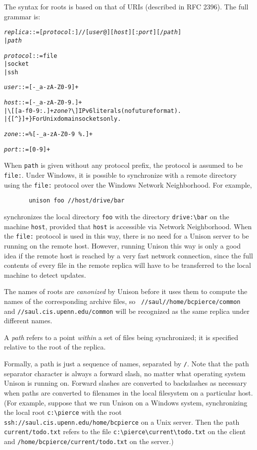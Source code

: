 \documentclass{article}
\newcommand{\NT}[1]{\textit{#1}}
\begin{document}
The syntax for roots is based on that of URIs (described in RFC 2396).
The full grammar is:
\begin{alltt}
  \NT{replica} ::= [\NT{protocol}:]//[\NT{user}@][\NT{host}][:\NT{port}][/\NT{path}]
           |  \NT{path}

  \NT{protocol} ::= file
            |  socket
            |  ssh

  \NT{user} ::= [-\_a-zA-Z0-9]+

  \NT{host} ::= [-\_a-zA-Z0-9.]+
        |  \textbackslash[ [a-f0-9:.]+ \NT{zone}? \textbackslash]    IPv6 literals (no future format).
        |  \{ [\^{}\}]+ \}                   For Unix domain sockets only.

  \NT{zone} ::= \%[-\_a-zA-Z0-9~\%.]+

  \NT{port} ::= [0-9]+
\end{alltt}
When \verb|path| is given without any protocol prefix, the protocol is
assumed to be \verb|file:|.  Under Windows, it is possible to
synchronize with a remote directory using the \verb|file:| protocol over
the Windows Network Neighborhood.  For example,
\begin{verbatim}
       unison foo //host/drive/bar
\end{verbatim}
\noindent
synchronizes the local directory \verb|foo| with the directory
\verb|drive:\bar| on the machine \verb|host|, provided that \verb|host|
is accessible via Network Neighborhood.  When the \verb|file:| protocol
is used in this way, there is no need for a Unison server to be running
on the remote host.  However, running Unison this way is only a good
idea if the remote host is reached by a very fast network connection,
since the full contents of every file in the remote replica will have to
be transferred to the local machine to detect updates.

The names of roots are {\em canonized} by Unison before it uses them
to compute the names of the corresponding archive files, so {\tt
  //saul//home/bcpierce/common} and {\tt //saul.cis.upenn.edu/common}
will be recognized as the same replica under different names.


A {\em path} refers to a point {\em within} a set of files being
synchronized; it is specified relative to the root of the replica.

Formally, a path is just a sequence of names, separated by \verb|/|.
Note that the path separator character is always a forward slash, no
matter what operating system Unison is running on.  Forward slashes
are converted to backslashes as necessary when paths are converted to
filenames in the local filesystem on a particular host.
%
(For example, suppose that we run Unison on a Windows system, synchronizing
the local root \verb|c:\pierce| with the root
\verb|ssh://saul.cis.upenn.edu/home/bcpierce| on a Unix server.  Then
the path \verb|current/todo.txt| refers to the file
\verb|c:\pierce\current\todo.txt| on the client and
\verb|/home/bcpierce/current/todo.txt| on the server.)
\end{document}
